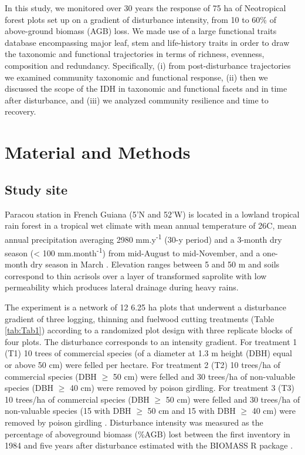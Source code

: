 \documentclass[fleqn,10pt]{ArtEcoFoG} %
\begin{document}
In this study, we monitored over 30 years the response of 75 ha of
Neotropical forest plots set up on a gradient of disturbance intensity,
from 10 to 60\% of above-ground biomass (AGB) loss. We made use of a
large functional traits database encompassing major leaf, stem and
life-history traits in order to draw the taxonomic and functional
trajectories in terms of richness, evenness, composition and redundancy.
Specifically, (i) from post-disturbance trajectories we examined
community taxonomic and functional response, (ii) then we discussed the
scope of the IDH in taxonomic and functional facets and in time after
disturbance, and (iii) we analyzed community resilience and time to
recovery.

\section{Material and Methods}\label{material-and-methods}

\subsection{Study site}\label{study-site}

Paracou station in French Guiana (5'N and
52'W) is located in a lowland tropical rain forest in a
tropical wet climate with mean annual temperature of 26\textdegree C,
mean annual precipitation averaging 2980 mm.y\textsuperscript{-1} (30-y
period) and a 3-month dry season (\textless{} 100
mm.month\textsuperscript{-1}) from mid-August to mid-November, and a
one-month dry season in March \citep{Wagner2011}. Elevation ranges
between 5 and 50 m and soils correspond to thin acrisols over a layer of
transformed saprolite with low permeability which produces lateral
drainage during heavy rains.

The experiment is a network of 12 6.25 ha plots that underwent a
disturbance gradient of three logging, thinning and fuelwood cutting
treatments (Table \ref{tab:Tab1}) according to a randomized plot design
with three replicate blocks of four plots. The disturbance corresponds
to an intensity gradient. For treatment 1 (T1) 10 trees of commercial
species (of a diameter at 1.3 m height (DBH) equal or above 50 cm) were
felled per hectare. For treatment 2 (T2) 10 trees/ha of commercial
species (DBH \(\geq\) 50 cm) were felled and 30 trees/ha of non-valuable
species (DBH \(\geq\) 40 cm) were removed by poison girdling. For
treatment 3 (T3) 10 trees/ha of commercial species (DBH \(\geq\) 50 cm)
were felled and 30 trees/ha of non-valuable species (15 with DBH
\(\geq\) 50 cm and 15 with DBH \(\geq\) 40 cm) were removed by poison
girdling \citep{Schmitt1990}. Disturbance intensity was measured as the
percentage of aboveground biomass (\%AGB) lost between the first
inventory in 1984 and five years after disturbance \citep{Piponiot2016}
estimated with the BIOMASS R package \citep{Biomass2018}.
\end{document}
